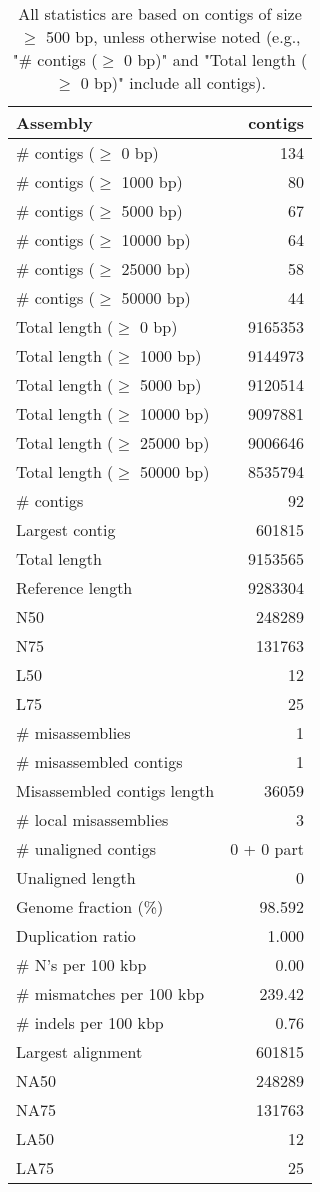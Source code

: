 \documentclass[12pt,a4paper]{article}
\begin{document}
\begin{table}[ht]
\begin{center}
\caption{All statistics are based on contigs of size $\geq$ 500 bp, unless otherwise noted (e.g., "\# contigs ($\geq$ 0 bp)" and "Total length ($\geq$ 0 bp)" include all contigs).}
\begin{tabular}{|l*{1}{|r}|}
\hline
Assembly & contigs \\ \hline
\# contigs ($\geq$ 0 bp) & 134 \\ \hline
\# contigs ($\geq$ 1000 bp) & 80 \\ \hline
\# contigs ($\geq$ 5000 bp) & 67 \\ \hline
\# contigs ($\geq$ 10000 bp) & 64 \\ \hline
\# contigs ($\geq$ 25000 bp) & 58 \\ \hline
\# contigs ($\geq$ 50000 bp) & 44 \\ \hline
Total length ($\geq$ 0 bp) & 9165353 \\ \hline
Total length ($\geq$ 1000 bp) & 9144973 \\ \hline
Total length ($\geq$ 5000 bp) & 9120514 \\ \hline
Total length ($\geq$ 10000 bp) & 9097881 \\ \hline
Total length ($\geq$ 25000 bp) & 9006646 \\ \hline
Total length ($\geq$ 50000 bp) & 8535794 \\ \hline
\# contigs & 92 \\ \hline
Largest contig & 601815 \\ \hline
Total length & 9153565 \\ \hline
Reference length & 9283304 \\ \hline
N50 & 248289 \\ \hline
N75 & 131763 \\ \hline
L50 & 12 \\ \hline
L75 & 25 \\ \hline
\# misassemblies & 1 \\ \hline
\# misassembled contigs & 1 \\ \hline
Misassembled contigs length & 36059 \\ \hline
\# local misassemblies & 3 \\ \hline
\# unaligned contigs & 0 + 0 part \\ \hline
Unaligned length & 0 \\ \hline
Genome fraction (\%) & 98.592 \\ \hline
Duplication ratio & 1.000 \\ \hline
\# N's per 100 kbp & 0.00 \\ \hline
\# mismatches per 100 kbp & 239.42 \\ \hline
\# indels per 100 kbp & 0.76 \\ \hline
Largest alignment & 601815 \\ \hline
NA50 & 248289 \\ \hline
NA75 & 131763 \\ \hline
LA50 & 12 \\ \hline
LA75 & 25 \\ \hline
\end{tabular}
\end{center}
\end{table}
\end{document}
